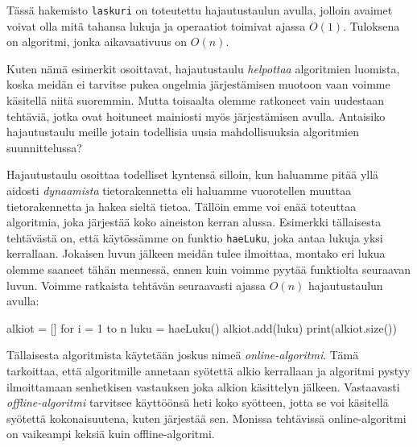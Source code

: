 Tässä hakemisto \texttt{laskuri}
on toteutettu hajautustaulun avulla,
jolloin avaimet voivat olla mitä tahansa lukuja
ja operaatiot toimivat ajassa $O(1)$.
Tuloksena on algoritmi, jonka aikavaativuus on $O(n)$.

Kuten nämä esimerkit osoittavat, hajautustaulu
\emph{helpottaa} algoritmien luomista,
koska meidän ei tarvitse pukea ongelmia järjestämisen muotoon
vaan voimme käsitellä niitä suoremmin.
Mutta toisaalta olemme ratkoneet vain uudestaan tehtäviä,
jotka ovat hoituneet mainiosti myös järjestämisen avulla.
Antaisiko hajautustaulu meille jotain todellisia uusia
mahdollisuuksia algoritmien suunnittelussa?

Hajautustaulu osoittaa todelliset kyntensä silloin,
kun haluamme pitää yllä aidosti \emph{dynaamista}
tietorakennetta eli haluamme vuorotellen muuttaa
tietorakennetta ja hakea sieltä tietoa.
Tällöin emme voi enää toteuttaa algoritmia,
joka järjestää koko aineiston kerran alussa.
Esimerkki tällaisesta tehtävästä on,
että käytössämme on funktio \texttt{haeLuku},
joka antaa lukuja yksi kerrallaan.
Jokaisen luvun jälkeen meidän tulee ilmoittaa,
montako eri lukua olemme saaneet tähän mennessä,
ennen kuin voimme pyytää funktiolta seuraavan luvun.
Voimme ratkaista tehtävän seuraavasti ajassa $O(n)$
hajautustaulun avulla:

\begin{code}
alkiot = []
for i = 1 to n
    luku = haeLuku()
    alkiot.add(luku)
    print(alkiot.size())
\end{code}


Tällaisesta algoritmista käytetään joskus nimeä
\emph{online-algoritmi}.
Tämä tarkoittaa, että algoritmille annetaan syötettä
alkio kerrallaan ja algoritmi pystyy ilmoittamaan senhetkisen
vastauksen joka alkion käsittelyn jälkeen.
Vastaavasti \emph{offline-algoritmi} tarvitsee
käyttöönsä heti koko syötteen,
jotta se voi käsitellä syötettä kokonaisuutena,
kuten järjestää sen.
Monissa tehtävissä online-algoritmi on vaikeampi
keksiä kuin offline-algoritmi.

